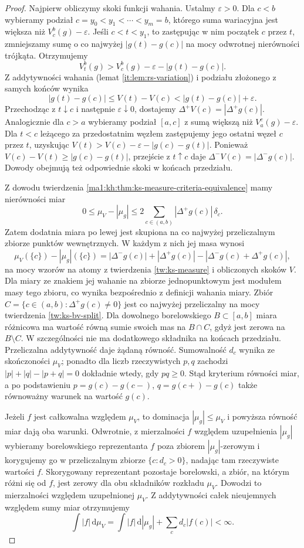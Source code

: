 \begin{proof}
Najpierw obliczymy skoki funkcji wahania. Ustalmy $\varepsilon>0$. Dla $c<b$ wybieramy podział $c=y_0<y_1<\cdots<y_m=b$, którego suma wariacyjna jest większa niż $V_c^b(g)-\varepsilon$. Jeśli $c<t<y_1$, to zastępując w nim początek $c$ przez $t$, zmniejszamy sumę o co najwyżej $|g(t)-g(c)|$ na mocy odwrotnej nierówności trójkąta. Otrzymujemy
\[
 V_t^b(g)>V_c^b(g)-\varepsilon-|g(t)-g(c)|.
\]
Z addytywności wahania (lemat \ref{it:lem:rs-variation}) i podziału złożonego z samych końców wynika
\[
 |g(t)-g(c)|\le V(t)-V(c)
 < |g(t)-g(c)|+\varepsilon .
\]
Przechodząc z $t\downarrow c$ i następnie $\varepsilon\downarrow0$, dostajemy $\Delta^+V(c)=|\Delta^+g(c)|$. Analogicznie dla $c>a$ wybieramy podział $[a,c]$ z sumą większą niż $V_a^c(g)-\varepsilon$. Dla $t<c$ leżącego za przedostatnim węzłem zastępujemy jego ostatni węzeł $c$ przez $t$, uzyskując $V(t)>V(c)-\varepsilon-|g(c)-g(t)|$. Ponieważ $V(c)-V(t)\ge |g(c)-g(t)|$, przejście z $t\uparrow c$ daje $\Delta^-V(c)=|\Delta^-g(c)|$. Dowody obejmują też odpowiednie skoki w końcach przedziału.

Z dowodu twierdzenia \ref{ma1:kh:thm:ks-measure-criteria-equivalence} mamy nierówności miar
\[
 0\le\mu_V-|\mu_g|
 \le 2\sum_{c\in(a,b)}|\Delta^+g(c)|\,\delta_c .
\]
Zatem dodatnia miara po lewej jest skupiona na co najwyżej przeliczalnym zbiorze punktów wewnętrznych. W każdym z nich jej masa wynosi
\[
 \mu_V(\{c\})-|\mu_g|(\{c\})
 =|\Delta^-g(c)|+|\Delta^+g(c)|
  -|\Delta^-g(c)+\Delta^+g(c)|,
\]
na mocy wzorów na atomy z twierdzenia \ref{tw:ks-measure} i obliczonych skoków $V$. Dla miary ze znakiem jej wahanie na zbiorze jednopunktowym jest modułem masy tego zbioru, co wynika bezpośrednio z definicji wahania miary. Zbiór $C=\{c\in(a,b):\Delta^+g(c)\ne0\}$ jest co najwyżej przeliczalny na mocy twierdzenia \ref{tw:ks-bv-split}. Dla dowolnego borelowskiego $B\subset[a,b]$ miara różnicowa ma wartość równą sumie swoich mas na $B\cap C$, gdyż jest zerowa na $B\setminus C$. W szczególności nie ma dodatkowego składnika na końcach przedziału. Przeliczalna addytywność daje żądaną równość. Sumowalność $d_c$ wynika ze skończoności $\mu_V$; ponadto dla liczb rzeczywistych $p,q$ zachodzi $|p|+|q|-|p+q|=0$ dokładnie wtedy, gdy $pq\ge0$. Stąd kryterium równości miar, a po podstawieniu $p=g(c)-g(c-)$, $q=g(c+)-g(c)$ także równoważny warunek na wartość $g(c)$.

Jeżeli $f$ jest całkowalna względem $\mu_V$, to dominacja $|\mu_g|\le\mu_V$ i powyższa równość miar dają oba warunki. Odwrotnie, z mierzalności $f$ względem uzupełnienia $|\mu_g|$ wybieramy borelowskiego reprezentanta $f$ poza zbiorem $|\mu_g|$-zerowym i korygujemy go w przeliczalnym zbiorze $\{c:d_c>0\}$, nadając tam rzeczywiste wartości $f$. Skorygowany reprezentant pozostaje borelowski, a zbiór, na którym różni się od $f$, jest zerowy dla obu składników rozkładu $\mu_V$. Dowodzi to mierzalności względem uzupełnionej $\mu_V$. Z addytywności całek nieujemnych względem sumy miar otrzymujemy
\[
 \int |f|\,\mathrm d\mu_V
 =\int |f|\,\mathrm d|\mu_g|+\sum_c d_c|f(c)|<\infty .
\]
\end{proof}
